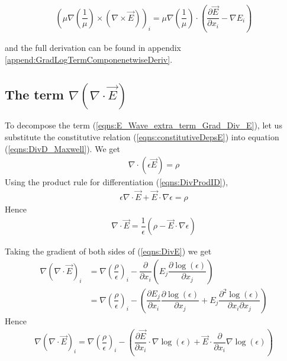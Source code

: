 \documentclass[12pt,twoside]{report}
\begin{document}
\begin{align}
\label{eqns:E_Wave_extra_term_log_mu_expanded}
\left(\mu \nabla \left( \dfrac{1}{\mu}\right) \times \left(\nabla \times \overrightarrow{E} \right) \right)_i = 
\mu \nabla \left(\dfrac{1}{\mu} \right) \cdot \left( \dfrac{\partial \overrightarrow{E}}{\partial x_i}- \nabla E_i \right)
\end{align}

and the full derivation can be found in appendix \ref{append:GradLogTermComponenetwiseDeriv}.






\subsection{The term $\nabla (\nabla \cdot \vec{E})$}
To decompose the term (\ref{eqns:E_Wave_extra_term_Grad_Div_E}), let us substitute the constitutive relation (\ref{eqns:constitutiveDepsE}) into equation (\ref{eqns:DivD_Maxwell}). We get
\begin{align*}
\nabla \cdot (\epsilon \overrightarrow{E}) = \rho
\end{align*}
Using the product rule for differentiation (\ref{eqns:DivProdID}), 
\begin{align*}
\epsilon\nabla \cdot \overrightarrow{E} + \overrightarrow{E} \cdot \nabla \epsilon = \rho
\end{align*}
Hence
\begin{align}
\label{eqns:DivE}
\nabla \cdot \overrightarrow{E} =\dfrac{1}{\epsilon} \left(\rho - \overrightarrow{E} \cdot \nabla \epsilon\right)
\end{align}

Taking the gradient of both sides of (\ref{eqns:DivE}) we get
\begin{align*}
\nabla \left( \nabla \cdot \overrightarrow{E} \right)_i &=\nabla\left( \dfrac{\rho}{\epsilon}\right)_i-\dfrac{\partial}{\partial x_i}\left( E_j \dfrac{\partial \log(\epsilon)}{\partial x_j}\right) \\&= \nabla\left( \dfrac{\rho}{\epsilon}\right)_i - \left( \dfrac{\partial E_j}{\partial x_i}\dfrac{\partial \log(\epsilon)}{\partial x_j} + E_j \dfrac{\partial^2 \log(\epsilon)}{\partial x_i \partial x_j}\right)
\end{align*}
Hence
\begin{align}
\label{eqns:E_Wave_extra_term_Grad_Div_E_expanded}
\nabla \left( \nabla \cdot \overrightarrow{E} \right)_i = \nabla\left( \dfrac{\rho}{\epsilon}\right)_i - \left(\dfrac{\partial \overrightarrow{E}}{\partial x_i} \cdot \nabla \log(\epsilon) + \overrightarrow{E} \cdot \dfrac{\partial}{\partial x_i} \nabla \log(\epsilon) \right)
\end{align}
\end{document}
